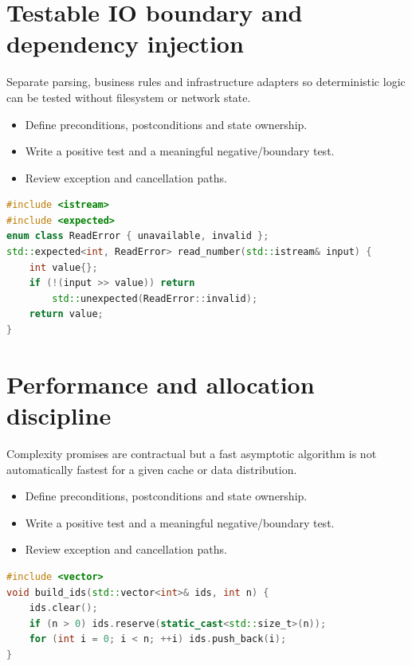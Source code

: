 \documentclass[11pt]{article}
\begin{document}
\section{Testable IO boundary and dependency injection}
Separate parsing, business rules and infrastructure adapters so deterministic logic can be tested without filesystem or network state.

\begin{itemize}[leftmargin=*,itemsep=1pt,topsep=3pt]
\item Define preconditions, postconditions and state ownership.
\item Write a positive test and a meaningful negative/boundary test.
\item Review exception and cancellation paths.
\end{itemize}
\begin{lstlisting}[language=C++]
#include <istream>
#include <expected>
enum class ReadError { unavailable, invalid };
std::expected<int, ReadError> read_number(std::istream& input) {
    int value{};
    if (!(input >> value)) return
        std::unexpected(ReadError::invalid);
    return value;
}
\end{lstlisting}
\section{Performance and allocation discipline}
Complexity promises are contractual but a fast asymptotic algorithm is not automatically fastest for a given cache or data distribution.

\begin{itemize}[leftmargin=*,itemsep=1pt,topsep=3pt]
\item Define preconditions, postconditions and state ownership.
\item Write a positive test and a meaningful negative/boundary test.
\item Review exception and cancellation paths.
\end{itemize}
\begin{lstlisting}[language=C++]
#include <vector>
void build_ids(std::vector<int>& ids, int n) {
    ids.clear();
    if (n > 0) ids.reserve(static_cast<std::size_t>(n));
    for (int i = 0; i < n; ++i) ids.push_back(i);
}
\end{lstlisting}
\end{document}
